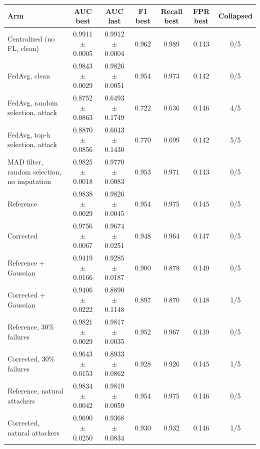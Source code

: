 \begin{tabular}{@{}lcccccc@{}}\toprule
Arm & AUC best & AUC last & F1 best & Recall best & FPR best & Collapsed\\
\midrule
Centralized (no FL, clean) & 0.9911$\pm$0.0005 & 0.9912$\pm$0.0004 & 0.962 & 0.989 & 0.143 & 0/5 \\
FedAvg, clean & 0.9843$\pm$0.0029 & 0.9826$\pm$0.0051 & 0.954 & 0.973 & 0.142 & 0/5 \\
FedAvg, random selection, attack & 0.8752$\pm$0.0863 & 0.6493$\pm$0.1749 & 0.722 & 0.636 & 0.146 & 4/5 \\
FedAvg, top-k selection, attack & 0.8870$\pm$0.0856 & 0.6043$\pm$0.1430 & 0.770 & 0.699 & 0.142 & 5/5 \\
MAD filter, random selection, no imputation & 0.9825$\pm$0.0018 & 0.9770$\pm$0.0083 & 0.953 & 0.971 & 0.143 & 0/5 \\
Reference & 0.9838$\pm$0.0029 & 0.9826$\pm$0.0045 & 0.954 & 0.975 & 0.145 & 0/5 \\
Corrected & 0.9756$\pm$0.0067 & 0.9674$\pm$0.0251 & 0.948 & 0.964 & 0.147 & 0/5 \\
Reference + Gaussian & 0.9419$\pm$0.0166 & 0.9285$\pm$0.0187 & 0.900 & 0.878 & 0.149 & 0/5 \\
Corrected + Gaussian & 0.9406$\pm$0.0222 & 0.8890$\pm$0.1148 & 0.897 & 0.870 & 0.148 & 1/5 \\
Reference, 30\% failures & 0.9821$\pm$0.0029 & 0.9817$\pm$0.0035 & 0.952 & 0.967 & 0.139 & 0/5 \\
Corrected, 30\% failures & 0.9643$\pm$0.0153 & 0.8933$\pm$0.0862 & 0.928 & 0.926 & 0.145 & 1/5 \\
Reference, natural attackers & 0.9834$\pm$0.0042 & 0.9819$\pm$0.0059 & 0.954 & 0.975 & 0.146 & 0/5 \\
Corrected, natural attackers & 0.9690$\pm$0.0250 & 0.9368$\pm$0.0834 & 0.930 & 0.932 & 0.146 & 1/5 \\
\bottomrule\end{tabular}

